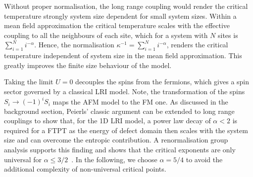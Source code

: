Without proper normalisation, the long range coupling would render the critical temperature strongly system size dependent for small system sizes. Within a mean field approximation the critical temperature scales with the effective coupling to all the neighbours of each site, which for a system with \(N\) sites is \(\sum_{i=1}^{N} i^{-\alpha}\). Hence, the normalisation \(\kappa^{-1} = \sum_{i=1}^{N} i^{-\alpha}\), renders the critical temperature independent of system size in the mean field approximation. This greatly improves the finite size behaviour of the model.

Taking the limit \(U = 0\) decouples the spins from the fermions, which gives a spin sector governed by a classical LRI model. Note, the transformation of the spins \(S_i \to (-1)^{i} S_i\) maps the AFM model to the FM one. As discussed in the background section, Peierls' classic argument can be extended to long range couplings to show that, for the 1D LRI model, a power law decay of \(\alpha < 2\) is required for a FTPT as the energy of defect domain then scales with the system size and can overcome the entropic contribution. A renormalisation group analysis supports this finding and shows that the critical exponents are only universal for \(\alpha \leq 3/2\)~\autocite{ruelleStatisticalMechanicsOnedimensional1968,thoulessLongRangeOrderOneDimensional1969,angeliniRelationsShortrangeLongrange2014}. In the following, we choose \(\alpha = 5/4\) to avoid the additional complexity of non-universal critical points.
